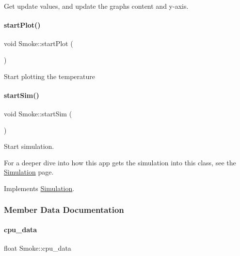 Get update values, and update the graph\textquotesingle{}s content and y-\/axis. \mbox{\label{classSmoke_a989e6653d16bee5d83dc53e766a1eae7}} 
\paragraph{\texorpdfstring{startPlot()}{startPlot()}}
{\footnotesize\ttfamily void Smoke\+::start\+Plot (\begin{DoxyParamCaption}{ }\end{DoxyParamCaption})}

Start plotting the temperature \mbox{\label{classSmoke_aca6f4c3a6e62bf27920229c5b53ae561}} 
\paragraph{\texorpdfstring{startSim()}{startSim()}}
{\footnotesize\ttfamily void Smoke\+::start\+Sim (\begin{DoxyParamCaption}{ }\end{DoxyParamCaption})\hspace{0.3cm}{\ttfamily [virtual]}}

Start simulation.

For a deeper dive into how this app gets the simulation into this class, see the \mbox{\hyperlink{classSimulation}{Simulation}} page. 

Implements \mbox{\hyperlink{classSimulation_ac523544ffc2b4cffed1d2a6ead5809b1}{Simulation}}.



\subsubsection{Member Data Documentation}
\mbox{\label{classSmoke_a27ecb4dc9f91a34bed0637c1743275cb}} 
\paragraph{\texorpdfstring{cpu\_data}{cpu\_data}}
{\footnotesize\ttfamily float Smoke\+::cpu\+\_\+data\hspace{0.3cm}{\ttfamily [private]}}




